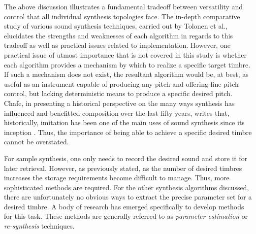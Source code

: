 \documentclass[12pt]{report} 	%
\numberwithin{figure}{chapter}
\numberwithin{table}{chapter}
\numberwithin{equation}{chapter}
\begin{document}
\begin{flushleft}
The above discussion illustrates a fundamental tradeoff between versatility and control that all individual synthesis topologies face. The in-depth comparative study of various sound synthesis techniques, carried out by Tolonen et al., elucidates the strengths and weaknesses of each algorithm in regards to this tradeoff as well as practical issues related to implementation. However, one practical issue of utmost importance that is not covered in this study is whether each algorithm provides a mechanism by which to realize a specific target timbre. If such a mechanism does not exist, the resultant algorithm would be, at best, as useful as an instrument capable of producing any pitch and offering fine pitch control, but lacking deterministic means to produce a specific desired pitch. Chafe, in presenting a historical perspective on the many ways synthesis has influenced and benefitted composition over the last fifty years, writes that, historically, imitation has been one of the main uses of sound synthesis since its inception \cite[p. 2]{Chafe:1999bx}. Thus, the importance of being able to achieve a specific desired timbre cannot be overstated.

For sample synthesis, one only needs to record the desired sound and store it for later retrieval. However, as previously stated, as the number of desired timbres increases the storage requirements become difficult to manage. Thus, more sophisticated methods are required. For the other synthesis algorithms discussed, there are unfortunately no obvious ways to extract the precise parameter set for a desired timbre. A body of research has emerged specifically to develop methods for this task. These methods are generally referred to as \textit{parameter estimation} or \textit{re-synthesis} techniques.


\end{flushleft}
\end{document}
